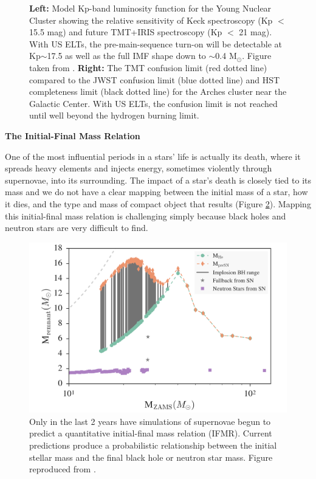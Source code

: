 \documentclass[11pt]{article}
\begin{document}
\begin{figure}
    \caption{{\bf Left:} Model Kp-band luminosity function for the Young Nuclear Cluster showing the relative sensitivity of Keck spectroscopy (Kp $<$ 15.5 mag) and future TMT+IRIS spectroscopy (Kp $<$ 21 mag). With US ELTs, the pre-main-sequence turn-on will be detectable at Kp$\sim$17.5 as well as the full IMF shape down to $\sim$0.4 M$_{\odot}$. Figure taken from \citet{Lu:2013}. {\bf Right:} The TMT confusion limit (red dotted line) compared to the JWST confusion limit (blue dotted line) and HST completeness limit (black dotted line) for the Arches cluster near the Galactic Center. With US ELTs, the confusion limit is not reached until well beyond the hydrogen burning limit.}
    \label{fig:TMT_YNC}
\end{figure}


{\bf \large The Initial-Final Mass Relation}

One of the most influential periods in a stars' life is actually its death, where it spreads heavy elements and injects energy, sometimes violently through supernovae, into its surrounding. The impact of a star's death is closely tied to its mass and we do not have a clear mapping between the initial mass of a star, how it dies, and the type and mass of compact object that results (Figure \ref{fig:ifmr_theory}). Mapping this initial-final mass relation is challenging simply because black holes and neutron stars are very difficult to find.  
 
\begin{figure}
    \centering
    \includegraphics[scale=0.4]{IFMR_raithel.png}
    \caption{Only in the last 2 years have simulations of supernovae begun to predict a quantitative initial-final mass relation (IFMR). Current predictions produce a probabilistic relationship between the initial stellar mass and the final black hole or neutron star mass. Figure reproduced from \citep{Raithel:2018}.
    \label{fig:ifmr_theory}
    }
\end{figure}
\end{document}
